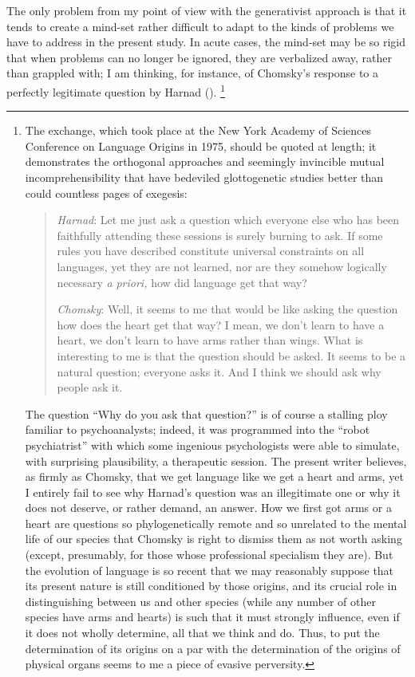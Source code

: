 The only problem from my point of view with the generativist approach is that it tends to create a mind-set rather difficult to adapt to the kinds of problems we have to address in the present study. In acute cases, the mind-set may be so rigid that when problems can no 
longer be ignored, they are verbalized away, rather than grappled with; I am thinking, for instance, of Chomsky's response to a perfectly legitimate question by Harnad (\citealt[57]{HarnadEtAl1976}).%
\footnote{\label{Fn3.1}The exchange, which took place at the New York Academy of Sciences Conference on Language Origins in 1975, should be quoted at length; it demonstrates the orthogonal approaches and seemingly invincible mutual incomprehensibility that have bedeviled glottogenetic studies better than could countless pages of exegesis:
	
\begin{quotation}
		\textit{Harnad}: Let me just ask a question which everyone else who has been faithfully attending these sessions is surely burning to ask. If some rules you have described constitute universal constraints on all languages, yet they are not learned, nor are they somehow logically necessary \textit{a} \textit{priori,} how did language get that way?
		
		\noindent\textit{Chomsky}: Well, it seems to me that would be like asking the question how does the heart get that way? I mean, we don't learn to have a heart, we don't learn to have arms rather than wings. What is interesting to me is that the question should be asked. It seems to be a natural question; everyone asks it. And I think we should ask why people ask it.
\end{quotation}
	
The question ``Why do you ask that question?'' is of course a stalling ploy familiar to psychoanalysts; indeed, it was programmed into the ``robot psychiatrist'' with which some ingenious psychologists were able to simulate, with surprising plausibility, a therapeutic session. The present writer believes, as firmly as Chomsky, that we get language like we get a heart and arms, yet I entirely fail to see why Harnad's question was an illegitimate one or why it does not deserve, or rather demand, an answer. How we first got arms or a heart are questions so phylo\-genetically remote and so unrelated to the mental life of our species that Chomsky is right to dismiss them as not worth asking (except, presumably, for those whose professional specialism they are). But the evolution of language is so recent that we may reasonably suppose that its present nature is still conditioned by those origins, and its crucial role in distinguishing between us and other species (while any number of other species have arms and hearts) is such that it must strongly influence, even if it does not wholly determine, all that we think and do. Thus, to put the determination of its origins on a par with the determination of the origins of physical organs seems to me a piece of evasive perversity.} %
